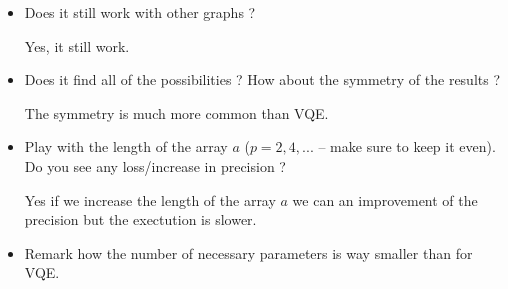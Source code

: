 \documentclass{article}
\theoremstyle{plain}
\begin{document}
  \begin{itemize}
    \item Does it still work with other graphs ?
      
      Yes, it still work.

    \item Does it find all of the possibilities ? How about the symmetry of
      the results ?

      The symmetry is much more common than VQE.

    \item Play with the length of the array $a$ ($p=2,4,...$ -- make sure to
      keep it even). Do you see any loss/increase in precision ?

      Yes if we increase the length of the array $a$ we can an improvement of
      the precision but the exectution is slower.


    \item Remark how the number of necessary parameters is way smaller than for
      VQE.
  \end{itemize}
\end{document}
